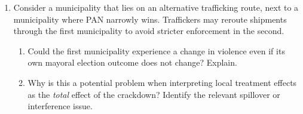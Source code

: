 \documentclass[12pt]{article}
\begin{document}
\begin{enumerate}
\item Consider a municipality that lies on an alternative trafficking route, next to a municipality where PAN narrowly wins. 
Traffickers may reroute shipments through the first municipality to avoid stricter enforcement in the second.
\begin{enumerate}
\item Could the first municipality experience a change in violence even if its own mayoral election outcome does not change? Explain.
\vspace{1.8cm}
\item Why is this a potential problem when interpreting local treatment effects as the \emph{total} effect of the crackdown? Identify the relevant spillover or interference issue.
\vspace{1.8cm}
\end{enumerate}
\end{enumerate}
\clearpage
\end{document}
